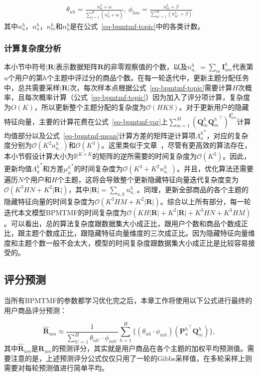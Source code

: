 \begin{align}
	\label{eq-bpmtmf-topicpara}
	\theta_{uh} = \frac{n_{u}^h+\alpha}{\sum_{j=1}^H (n_{u}^j+\alpha)},\ 
	\phi_{hm} = \frac{n_{m}^h+\beta}{\sum_{m'=1}^{M}(n_{m'}^h+\beta)}
\end{align}
其中$n_{u}^h$，$n_{u}^h$，$n_{m}^h$和$n_{h}^h$是在公式~\ref{eq-bpmtmf-topic}中的各类计数。

\subsubsection{计算复杂度分析} 
本小节中符号$|\mathbf{R}|$表示数据矩阵$\mathbf{R}$的非零观察值的个数，以及$n_{u,\cdot}^h=\sum_{m}\mathbf{I}^{h}_{um}$代表第$u$个用户的第$h$个主题中评过分的商品个数。在每一轮迭代中，更新主题分配任务中，总共需要采样$|\mathbf{R}|$次，每次样本点根据公式~\ref{eq-bpmtmf-topic}需要计算$H$次概率，且每次概率计算（公式~\ref{eq-bpmtmf-topic}）因为加入了评分项计算，复杂度为$O(K)$，所以更新整个主题分配的复杂度为$\mathcal{O}(HKS)$。对于更新用户的隐藏特征向量，主要的计算花费在公式~\ref{eq-bpmtmf-var}上$\sum_{m=1}^M(\mathbf{Q}_m^{h}{\mathbf{Q}_m^{h}}^{\top})^{\mathbf{I}^{h}_{um}}$计算均值部分以及公式~\ref{eq-bpmtmf-mean}计算方差的矩阵逆计算项${\Lambda_u^{h}}^*$，对应的复杂度分别为$\mathcal{O}(K^2n_{u,\cdot}^{h})$和$\mathcal{O}(K^3)$。这里类似于文章~\cite{hu2008collaborative}，尽管有更高效的算法存在，本小节假设计算大小为$\mathbb{R}^{K \times K }$的矩阵的逆所需要的时间复杂度为$\mathcal{O}(K^3)$。因此，更新均值${\Lambda_u^{h}}^\ast$和方差${\mu_u^{h}}^\ast$的时间复杂度为$\mathcal{O}(K^3+K ^2n_{u,\cdot}^{h})$。并且，优化算法还需要遍历$N$个用户和$H$个主题，这将会导致整个更新隐藏特征向量迭代复杂度变为$\mathcal{O}(K^3HN+K^2|\mathbf{R}|)$，其中$|\mathbf{R}|=\sum_{u,k}n_{u,\cdot}^h$。同理，更新全部商品的各个主题的隐藏特征向量的时间复杂度为$\mathcal{O}(K^3HM+K^2|\mathbf{R}|)$。综合以上所有部分，每一轮迭代本文模型BPMTMF的时间复杂度为$\mathcal{O}(KH|\mathbf{R}|+K^2|\mathbf{R}|+K^3HN+K^3HM)$。可以看出，总的算法复杂度跟数据集大小成正比，跟用户个数和商品个数成正比，跟主题个数成正比，跟隐藏特征向量维度的三次成正比。因为隐藏特征向量维度和主题个数一般不会太大，模型的时间复杂度跟数据集大小成正比是比较容易接受的。


\subsection{评分预测}
\label{subsec-bpmtmf-prediction}
当所有BPMTMF的参数都学习优化完之后，本章工作将使用以下公式进行最终的用户商品评分预测：

\begin{equation}\label{eq-bpmtmf-finalpred}
	\hat{\mathbf{R}}_{um} \approx 
	\frac{1}{\sum_{h'=1}^{H}\theta_{uh'}\cdot \phi_{mh'}}\sum_{h=1}^{H} \bigg\{(\theta_{uh}\cdot\phi_{mh}) ({\mathbf{P}_u^{h}}^{\top} \mathbf{Q}_m^{h})\bigg\},\nonumber
\end{equation}
其中$\hat{\mathbf{R}}_{um}$是$\mathbf{R}_{um}$的预测评分，其实就是用户商品在各个主题的加权平均预测值。需要注意的是，上述预测评分公式仅仅只用了一轮的Gibbs采样值，在多轮采样上则需要对每轮预测值进行简单平均。

